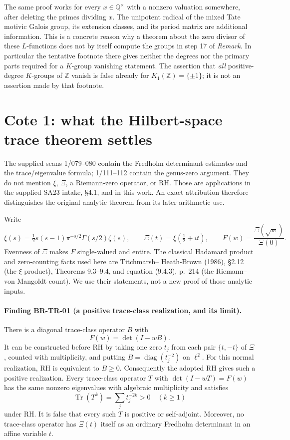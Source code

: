 The same proof works for every $x\in\mathbb Q^\times$ with a nonzero
valuation somewhere, after deleting the primes dividing $x$.
The unipotent radical of the mixed Tate motivic Galois group, its
extension classes, and its period matrix are additional information.
This is a concrete reason why a theorem about the zero divisor of
these $L$-functions does not by itself compute the groups in step 17
of \emph{Remark}.  In particular the tentative footnote there gives
neither the degrees nor the primary parts required for a $K$-group
vanishing statement.  The assertion that \emph{all} positive-degree
$K$-groups of $\mathbb Z$ vanish is false already for
$K_1(\mathbb Z)=\{\pm1\}$; it is not an assertion made by that footnote.

\section{Cote 1: what the Hilbert-space trace theorem settles}
\label{sec:root-trace}

The supplied scans 1/079--080 contain the Fredholm determinant estimates
and the trace/eigenvalue formula; 1/111--112 contain the genus-zero
argument.  They do not mention $\xi$, $\Xi$, a Riemann-zero operator,
or RH.  Those are applications in the supplied SA23 intake, \S4.1,
and in this work.  An exact attribution therefore distinguishes the
original analytic theorem from its later arithmetic use.

Write
\[
 \xi(s)=\tfrac12s(s-1)\pi^{-s/2}\Gamma(s/2)\zeta(s),\qquad
 \Xi(t)=\xi(\tfrac12+it),\qquad F(w)=\frac{\Xi(\sqrt w)}{\Xi(0)}.
\]
Evenness of $\Xi$ makes $F$ single-valued and entire.  The classical
Hadamard product and zero-counting facts used here are Titchmarsh--
Heath-Brown (1986), \S2.12 (the $\xi$ product), Theorems 9.3--9.4,
and equation (9.4.3), p.~214 (the Riemann--von Mangoldt count).
We use their statements, not a
new proof of those analytic inputs.

\paragraph{Finding BR-TR-01 (a positive trace-class realization, and its limit).}
There is a diagonal trace-class operator $B$ with
\[
 F(w)=\det(I-wB).
\]
It can be constructed before RH by taking one zero $t_j$ from each
pair $\{t,-t\}$ of $\Xi$, counted with multiplicity, and putting
$B=\operatorname{diag}(t_j^{-2})$ on $\ell^2$.
For this normal realization, RH is equivalent to $B\geq0$.
Consequently the adopted RH gives such a positive realization.
Every trace-class operator $T$ with $\det(I-wT)=F(w)$ has the same
nonzero eigenvalues with algebraic multiplicity and satisfies
\[
 \operatorname{Tr}(T^k)=\sum_jt_j^{-2k}>0\quad(k\geq1)
\]
under RH.  It is false that every such $T$ is positive or self-adjoint.
Moreover, no trace-class operator has $\Xi(t)$ itself as an ordinary
Fredholm determinant in an affine variable $t$.


